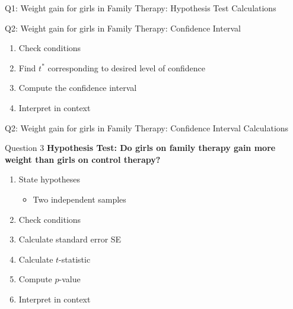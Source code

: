 \documentclass[
  ignorenonframetext,
  aspectratio=32,
]{beamer}
\providecommand{\tightlist}{%
  \setlength{\itemsep}{0pt}\setlength{\parskip}{0pt}}\usepackage{longtable,booktabs,array}
\begin{document}
\begin{frame}
\begin{block}{Q1: Weight gain for girls in Family Therapy: Hypothesis
Test Calculations}
\protect\hypertarget{q1-weight-gain-for-girls-in-family-therapy-hypothesis-test-calculations}{}
\end{block}
\end{frame}

\begin{frame}{Q2: Weight gain for girls in Family Therapy: Confidence
Interval}
\protect\hypertarget{q2-weight-gain-for-girls-in-family-therapy-confidence-interval}{}
\begin{enumerate}
\item
  Check conditions
\item
  Find \(t^*\) corresponding to desired level of confidence
\item
  Compute the confidence interval
\item
  Interpret in context
\end{enumerate}
\end{frame}

\begin{frame}
\begin{block}{Q2: Weight gain for girls in Family Therapy: Confidence
Interval Calculations}
\protect\hypertarget{q2-weight-gain-for-girls-in-family-therapy-confidence-interval-calculations}{}
\end{block}
\end{frame}

\begin{frame}{Question 3}
\protect\hypertarget{question-3}{}
\textbf{Hypothesis Test: Do girls on family therapy gain more weight
than girls on control therapy?}

\begin{enumerate}
\item
  State hypotheses

  \begin{itemize}
  \tightlist
  \item
    Two independent samples
  \end{itemize}
\item
  Check conditions
\item
  Calculate standard error SE
\item
  Calculate \(t\)-statistic
\item
  Compute \(p\)-value
\item
  Interpret in context
\end{enumerate}
\end{frame}
\end{document}
